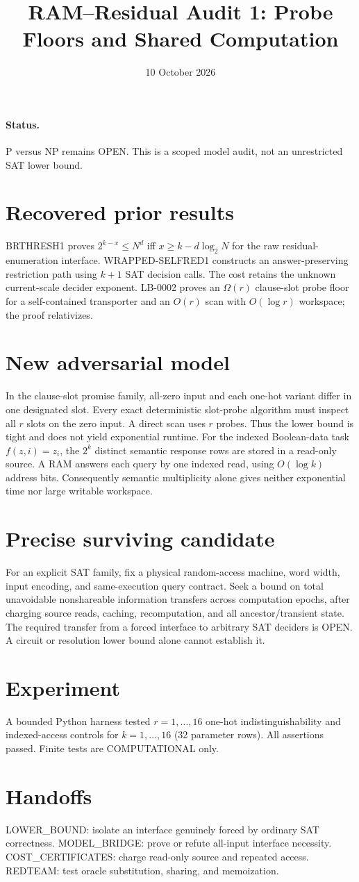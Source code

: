 \documentclass{article}
\title{RAM--Residual Audit 1: Probe Floors and Shared Computation}
\date{10 October 2026}
\begin{document}
\maketitle
\paragraph{Status.} P versus NP remains OPEN. This is a scoped model audit, not an unrestricted SAT lower bound.
\section*{Recovered prior results}
BRTHRESH1 proves $2^{k-x}\le N^d$ iff $x\ge k-d\log_2N$ for the raw residual-enumeration interface. WRAPPED-SELFRED1 constructs an answer-preserving restriction path using $k+1$ SAT decision calls. The cost retains the unknown current-scale decider exponent. LB-0002 proves an $\Omega(r)$ clause-slot probe floor for a self-contained transporter and an $O(r)$ scan with $O(\log r)$ workspace; the proof relativizes.
\section*{New adversarial model}
In the clause-slot promise family, all-zero input and each one-hot variant differ in one designated slot. Every exact deterministic slot-probe algorithm must inspect all $r$ slots on the zero input. A direct scan uses $r$ probes. Thus the lower bound is tight and does not yield exponential runtime.
For the indexed Boolean-data task $f(z,i)=z_i$, the $2^k$ distinct semantic response rows are stored in a read-only source. A RAM answers each query by one indexed read, using $O(\log k)$ address bits. Consequently semantic multiplicity alone gives neither exponential time nor large writable workspace.
\section*{Precise surviving candidate}
For an explicit SAT family, fix a physical random-access machine, word width, input encoding, and same-execution query contract. Seek a bound on total unavoidable nonshareable information transfers across computation epochs, after charging source reads, caching, recomputation, and all ancestor/transient state. The required transfer from a forced interface to arbitrary SAT deciders is OPEN. A circuit or resolution lower bound alone cannot establish it.
\section*{Experiment}
A bounded Python harness tested $r=1,\ldots,16$ one-hot indistinguishability and indexed-access controls for $k=1,\ldots,16$ (32 parameter rows). All assertions passed. Finite tests are COMPUTATIONAL only.
\section*{Handoffs}
LOWER\_BOUND: isolate an interface genuinely forced by ordinary SAT correctness. MODEL\_BRIDGE: prove or refute all-input interface necessity. COST\_CERTIFICATES: charge read-only source and repeated access. REDTEAM: test oracle substitution, sharing, and memoization.
\end{document}

